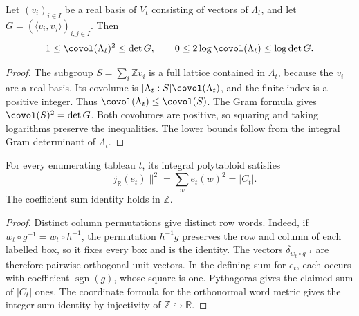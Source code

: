 \begin{lemma}
\label{lem:specht-covolume-upper}
\leanok
Let $(v_i)_{i\in I}$ be a real basis of $V_t$ consisting of vectors
of $\Lambda_t$, and let $G=(\langle v_i,v_j\rangle)_{i,j\in I}$.
Then
\[
 1\leq\covol(\Lambda_t)^2\leq\det G,\qquad
 0\leq2\log\covol(\Lambda_t)\leq\log\det G.
\]
\end{lemma}
\begin{proof}
The subgroup $S=\sum_i\mathbb Z v_i$ is a full lattice contained
in $\Lambda_t$, because the $v_i$ are a real basis. Its covolume
is $[\Lambda_t:S]\covol(\Lambda_t)$, and the finite index is a
positive integer. Thus $\covol(\Lambda_t)\leq\covol(S)$.
The Gram formula gives $\covol(S)^2=\det G$. Both covolumes
are positive, so squaring and taking logarithms preserve the
inequalities. The lower bounds follow from the integral Gram
determinant of $\Lambda_t$.
\end{proof}

\begin{lemma}
\label{lem:polytabloid-norm}
\leanok
For every enumerating tableau $t$, its integral polytabloid satisfies
\[
 \|j_\mathbb R(e_t)\|^2=\sum_w e_t(w)^2=|C_t|.
\]
The coefficient sum identity holds in $\mathbb Z$.
\end{lemma}
\begin{proof}
Distinct column permutations give distinct row words. Indeed, if
$w_t\circ g^{-1}=w_t\circ h^{-1}$, the permutation $h^{-1}g$
preserves the row and column of each labelled box, so it fixes every
box and is the identity. The vectors $\delta_{w_t\circ g^{-1}}$
are therefore pairwise orthogonal unit vectors. In the defining sum
for $e_t$, each occurs with coefficient $\operatorname{sgn}(g)$,
whose square is one. Pythagoras gives the claimed sum of $|C_t|$
ones. The coordinate formula for the orthonormal word metric gives the
integer sum identity by injectivity of $\mathbb Z\hookrightarrow\mathbb R$.
\end{proof}

